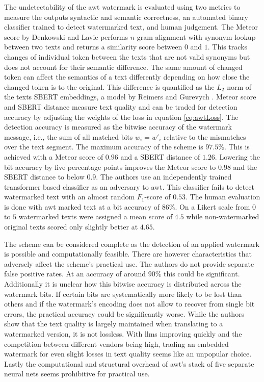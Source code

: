     The undetectability of the \ac{awt} watermark is evaluated using two metrics to measure the outputs syntactic and semantic correctness, an automated binary classifier trained to detect watermarked text, and human judgement.
    The Meteor score by Denkowski and Lavie \cite{denkowski2014meteor} performs $n$-gram alignment with synonym lookup between two texts and returns a similarity score between $0$ and $1$.
    This tracks changes of individual token between the texts that are not valid synonyms but does not account for their semantic difference.
    The same amount of changed token can affect the semantics of a text differently depending on how close the changed token is to the original.
    This difference is quantified as the $L_2$ norm of the texts SBERT embeddings, a model by Reimers and Gurevych \cite{reimers2019sentencebert}.
    Meteor score and SBERT distance measure text quality and can be traded for detection accuracy by adjusting the weights of the loss in equation \ref{eq:awtLoss}.
    The detection accuracy is measured as the bitwise accuracy of the watermark message, i.e., the sum of all matched bits $w_i = w'_i$ relative to the mismatches over the text segment.
    The maximum accuracy of the scheme is $97.5\%$.
    This is achieved with a Meteor score of $0.96$ and a SBERT distance of $1.26$.
    Lowering the bit accuracy by five percentage points improves the Meteor score to $0.98$ and the SBERT distance to below $0.9$.
    The authors use an independently trained transformer based classifier as an adversary to \ac{awt}.
    This classifier fails to detect watermarked text with an almost random $F_1$-score of $0.53$.
    The human evaluation is done with \ac{awt} marked text at a bit accuracy of $86\%$.
    On a Likert scale from $0$ to $5$ watermarked texts were assigned a mean score of $4.5$ while non-watermarked original texts scored only slightly better at $4.65$.

    The scheme can be considered complete as the detection of an applied watermark is possible and computationally feasible.
    There are however characteristics that adversely affect the scheme's practical use.
    The authors do not provide separate false positive rates.
    At an accuracy of around $90\%$ this could be significant.
    Additionally it is unclear how this bitwise accuracy is distributed across the watermark bits.
    If certain bits are systematically more likely to be lost than others and if the watermark's encoding does not allow to recover from single bit errors, the practical accuracy could be significantly worse.
    While the authors show that the text quality is largely maintained when translating to a watermarked version, it is not lossless.
    With \acp{llm} improving quickly and the competition between different vendors being high, trading an embedded watermark for even slight losses in text quality seems like an unpopular choice. 
    Lastly the computational and structural overhead of \acs{awt}'s stack of five separate neural nets seems prohibitive for practical use.
    
